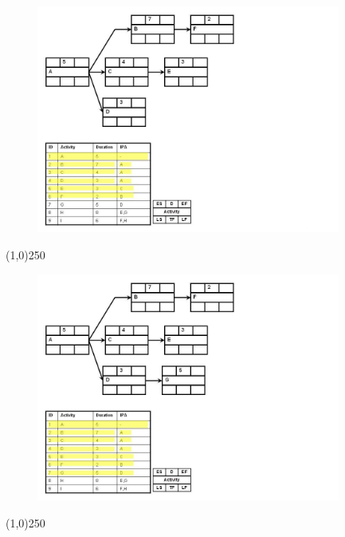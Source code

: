 \begin{frame}
\begin{figure}
	\centering
		\includegraphics[width = 10.0cm]{oldnotes/Slide134.jpg}
\end{figure}
\end{frame}
\begin{center}\line(1,0){250}\end{center}


\begin{frame}
\begin{figure}
	\centering
		\includegraphics[width = 10.0cm]{oldnotes/Slide135.jpg}
\end{figure}
\end{frame}
\begin{center}\line(1,0){250}\end{center}




